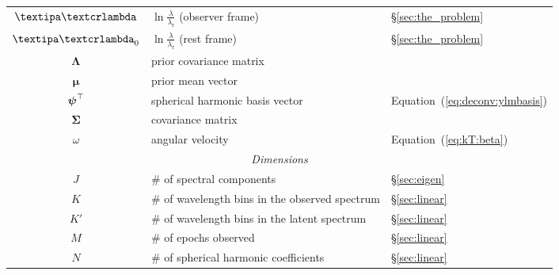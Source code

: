 \documentclass[modern]{aastex631}
\begin{document}
\begin{center}
\begin{longtable}{cll}
        $\lnlam$                                            & $\ln\frac{\lambda}{\lambda_\mathrm{r}}$ (observer frame)     & \S\ref{sec:the_problem}                    \\
        $\lnlam_0$                                          & $\ln\frac{\lambda}{\lambda_\mathrm{r}}$ (rest frame)         & \S\ref{sec:the_problem}                    \\
        $\boldsymbol{\Lambda}$                              & prior covariance matrix                                      &                                            \\
        $\boldsymbol{\mu}$                                  & prior mean vector                                            &                                            \\
        $\boldsymbol{\psi}^\top$                                         & spherical harmonic basis vector                              & Equation~(\ref{eq:deconv:ylmbasis})        \\
        $\boldsymbol{\Sigma}$                               & covariance matrix                                            &                                            \\
        $\omega$                                            & angular velocity                                             & Equation~(\ref{eq:kT:beta})                \\
        \midrule
        \multicolumn{3}{c}{\emph{Dimensions}}                                                                                                                           \\
        \midrule
        $J$                                                 & \# of spectral components                                    & \S\ref{sec:eigen}                          \\
        $K$                                                 & \# of wavelength bins in the observed spectrum               & \S\ref{sec:linear}                         \\
        $K'$                                                & \# of wavelength bins in the latent spectrum                 & \S\ref{sec:linear}                         \\
        $M$                                                 & \# of epochs observed                                        & \S\ref{sec:linear}                         \\
        $N$                                                 & \# of spherical harmonic coefficients                        & \S\ref{sec:linear}                         \\

\end{longtable}
\end{center}
\end{document}
